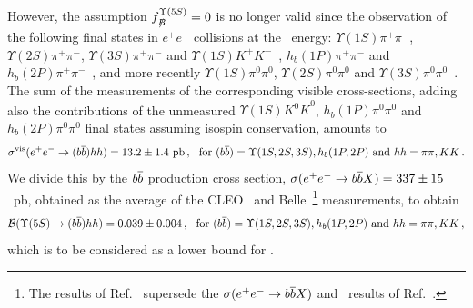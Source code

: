 However, the assumption $f^{\Upsilon(5S)}_{B\!\!\!\!/}=0$ is no longer valid since the observation of
the following final states in $e^+e^-$ collisions at the \Upsfive\ energy:
$\Upsilon(1S)\pi^+\pi^-$,
$\Upsilon(2S)\pi^+\pi^-$,
$\Upsilon(3S)\pi^+\pi^-$
and
$\Upsilon(1S)K^+K^-$~\cite{Abe:2007tk,Garmash:2014dhx_mod},
$h_b(1P)\pi^+\pi^-$ and 
$h_b(2P)\pi^+\pi^-$~\cite{Adachi:2011ji},
and more recently 
$\Upsilon(1S)\pi^0\pi^0$,
$\Upsilon(2S)\pi^0\pi^0$ 
and
$\Upsilon(3S)\pi^0\pi^0$~\cite{Krokovny:2013mgx}.
The sum of the measurements of the corresponding visible cross-sections,
adding also the contributions of the unmeasured
$\Upsilon(1S)K^0\bar{K}^0$, $h_b(1P)\pi^0\pi^0$ and $h_b(2P)\pi^0\pi^0$ final states
assuming isospin conservation, amounts to
$$
\sigma^{\rm vis}(e^+e^-\to (\b\bar{\b})hh) = 13.2\pm1.4~{\rm pb} \,,
~~\mbox{for $(\b\bar{\b})=\Upsilon(1S,2S,3S),h_b(1P,2P)$ and $hh=\pi\pi,KK$}\,.
$$
We divide this by the $\b\bar{\b}$ production cross section, 
$\sigma(e^+e^- \to \b\bar{\b} X) = 337 \pm 15$~pb, obtained as the average of the 
CLEO~\cite{Artuso:2005xw} and Belle~\cite{Esen:2012yz}\footnote{
  \label{foot:life_mix:Esen:2012yz}
  The results of Ref.~\cite{Esen:2012yz} supersede the $\sigma(e^+e^- \to \b\bar{\b} X)$ and \fsfive\ results of Ref.~\cite{Drutskoy:2006fg}.
} measurements, to obtain
$$
{\cal B}(\Upsfive\to (\b\bar{\b})hh) = 0.039\pm0.004 \,,
~~\mbox{for $(\b\bar{\b})=\Upsilon(1S,2S,3S),h_b(1P,2P)$ and $hh=\pi\pi,KK$}\,,
$$
which is to be considered as a lower bound for \fnBfive. 



